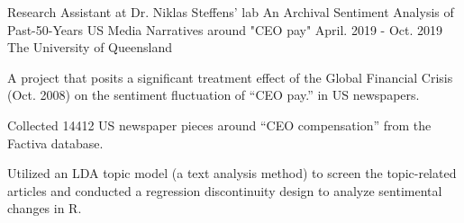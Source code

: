 \begin{cventries}
        \cventry
    {Research Assistant at Dr. Niklas Steffens' lab} %
    {An Archival Sentiment Analysis of Past-50-Years US Media Narratives around "CEO pay"  } 
    {April. 2019 - Oct. 2019} %
    {The University of Queensland} %
    {
      \begin{cvitems} %
        \item {A project that posits a significant treatment effect of the Global Financial Crisis (Oct. 2008) on the sentiment fluctuation of “CEO pay.” in US newspapers.}
        \item {Collected 14412 US newspaper pieces around “CEO compensation” from the Factiva database.}
        \item {Utilized an LDA topic model (a text analysis method) to screen the topic-related articles and conducted a regression discontinuity design to analyze sentimental changes in R.}
      \end{cvitems}
    }
\end{cventries}


